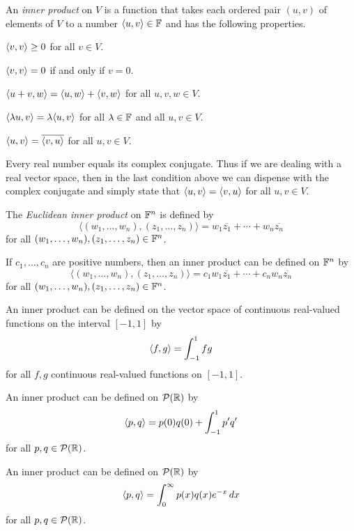 \begin{definition}\label{ax:6.2}
An \emph{inner product} on $V$ is a function that takes each ordered pair
$(u,v)$ of elements of $V$ to a number $\langle u, v \rangle\in\mathbb{F}$ and has the following
properties.
\begin{axprops}
\item[positivity] $\langle v, v \rangle\ge0$ for all $v\in V$.
\item[definiteness] $\langle v, v \rangle=0$ if and only if $v=0$.
\item[additivity in first slot] $\langle u+v, w \rangle=\langle u, w \rangle+\langle v, w \rangle$ for all
  $u,v,w\in V$.
\item[homogeneity in first slot] $\langle \lambda u, v \rangle=\lambda\langle u, v \rangle$ for all
  $\lambda\in\mathbb{F}$ and all $u,v\in V$.
\item[conjugate symmetry] $\langle u, v \rangle=\overline{\langle v, u \rangle}$ for all $u,v\in V$.
\end{axprops}
\end{definition}

%
Every real number equals its complex conjugate. Thus if we are dealing with a
real vector space, then in the last condition above we can dispense with the
complex conjugate and simply state that $\langle u, v \rangle=\langle v, u \rangle$ for all
$u,v\in V$.

\begin{example}\label{ax:6.3}\leavevmode
\begin{parts}
\item The \emph{Euclidean inner product} on $\mathbb{F}^n$ is defined by
  \[ \bigl\langle(w_1,\dots,w_n),(z_1,\dots,z_n)\bigr\rangle
     = w_1\overline{z_1}+\cdots+w_n\overline{z_n} \]
  for all $(w_1,\dots,w_n),(z_1,\dots,z_n)\in\mathbb{F}^n$.
\item If $c_1,\dots,c_n$ are positive numbers, then an inner product can be
  defined on $\mathbb{F}^n$ by
  \[ \bigl\langle(w_1,\dots,w_n),(z_1,\dots,z_n)\bigr\rangle
     = c_1w_1\overline{z_1}+\cdots+c_nw_n\overline{z_n} \]
  for all $(w_1,\dots,w_n),(z_1,\dots,z_n)\in\mathbb{F}^n$.
\item An inner product can be defined on the vector space of continuous
  real-valued functions on the interval $[-1,1]$ by
  \[ \langle f, g \rangle = \int_{-1}^1 fg \]
  for all $f,g$ continuous real-valued functions on $[-1,1]$.
\item An inner product can be defined on $\mathcal{P}(\mathbb{R})$ by
  \[ \langle p, q \rangle = p(0)q(0)+\int_{-1}^1 p'q' \]
  for all $p,q\in\mathcal{P}(\mathbb{R})$.
\item An inner product can be defined on $\mathcal{P}(\mathbb{R})$ by
  \[ \langle p, q \rangle = \int_0^\infty p(x)q(x)e^{-x}\,dx \]
  for all $p,q\in\mathcal{P}(\mathbb{R})$.
\end{parts}
\end{example}

